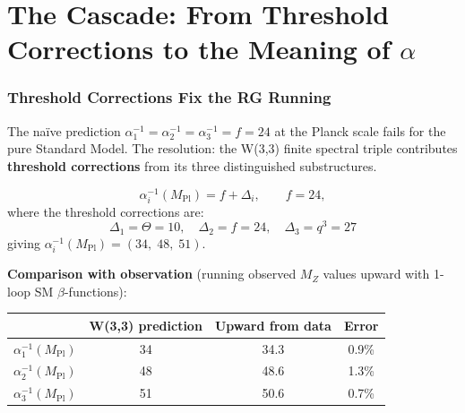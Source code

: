 \clearpage
\part{\texorpdfstring{The Cascade: From Threshold Corrections to the Meaning of $\alpha$}{The Cascade: From Threshold Corrections to the Meaning of alpha}}

\section{Threshold Corrections Fix the RG Running}
\label{sec:threshold}

The na\"ive prediction $\alpha_1^{-1}=\alpha_2^{-1}=\alpha_3^{-1}=f=24$
at the Planck scale fails for the pure Standard Model.
The resolution: the W(3,3) finite spectral triple contributes
\textbf{threshold corrections} from its three distinguished substructures.

\begin{theorem}
\label{thm:threshold}
\begin{equation}
\alpha_i^{-1}(M_{\mathrm{Pl}}) = f + \Delta_i, \qquad
f = 24,
\end{equation}
where the threshold corrections are:
\begin{equation}
\boxed{
\Delta_1 = \Theta = 10, \quad
\Delta_2 = f = 24, \quad
\Delta_3 = q^3 = 27
}
\end{equation}
giving $\alpha_i^{-1}(M_{\mathrm{Pl}}) = (34,\;48,\;51)$.
\end{theorem}

\noindent\textbf{Comparison with observation} (running observed $M_Z$ values
upward with 1-loop SM $\beta$-functions):
\begin{center}
\begin{tabular}{@{}lccc@{}}
\toprule
& W(3,3) prediction & Upward from data & Error \\
\midrule
$\alpha_1^{-1}(M_{\mathrm{Pl}})$ & 34 & 34.3 & 0.9\% \\
$\alpha_2^{-1}(M_{\mathrm{Pl}})$ & 48 & 48.6 & 1.3\% \\
$\alpha_3^{-1}(M_{\mathrm{Pl}})$ & 51 & 50.6 & 0.7\% \\
\bottomrule
\end{tabular}
\end{center}

